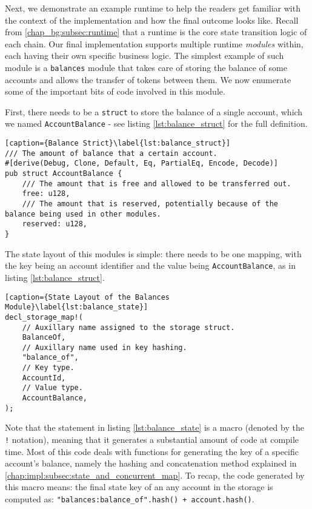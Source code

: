 Next, we demonstrate an example runtime to help the readers get familiar with the context of the
implementation and how the final outcome looks like. Recall from \ref{chap_bg:subsec:runtime} that
a runtime is the core state transition logic of each chain. Our final implementation supports
multiple runtime \textit{modules} within, each having their own specific business logic. The
simplest example of such module is a \texttt{balances} module that takes care of storing the balance
of some accounts and allows the transfer of tokens between them. We now enumerate some of the
important bits of code involved in this module.

First, there needs to be a \texttt{struct} to store the balance of a single account, which we named
\texttt{AccountBalance} - see listing \ref{lst:balance_struct} for the full definition.

\begin{lstlisting}[caption={Balance Strict}\label{lst:balance_struct}]
/// The amount of balance that a certain account.
#[derive(Debug, Clone, Default, Eq, PartialEq, Encode, Decode)]
pub struct AccountBalance {
	/// The amount that is free and allowed to be transferred out.
	free: u128,
	/// The amount that is reserved, potentially because of the balance being used in other modules.
	reserved: u128,
}
\end{lstlisting}

The state layout of this modules is simple: there needs to be one mapping, with the key being an
account identifier and the value being \texttt{AccountBalance}, as in listing
\ref{lst:balance_struct}.

\begin{lstlisting}[caption={State Layout of the Balances Module}\label{lst:balance_state}]
decl_storage_map!(
	// Auxillary name assigned to the storage struct.
	BalanceOf,
	// Auxillary name used in key hashing.
	"balance_of",
	// Key type.
	AccountId,
	// Value type.
	AccountBalance,
);
\end{lstlisting}

Note that the statement in listing \ref{lst:balance_state} is a macro (denoted by the \texttt{!}
notation), meaning that it generates a substantial amount of code at compile time. Most of this code
deals with functions for generating the key of a specific account's balance, namely the hashing and
concatenation method explained in \ref{chap:impl:subsec:state_and_concurrent_map}. To recap, the
code generated by this macro means: the final state key of an any account in the storage is computed
as: \texttt{"balances:balance\_of".hash() + account.hash()}.

